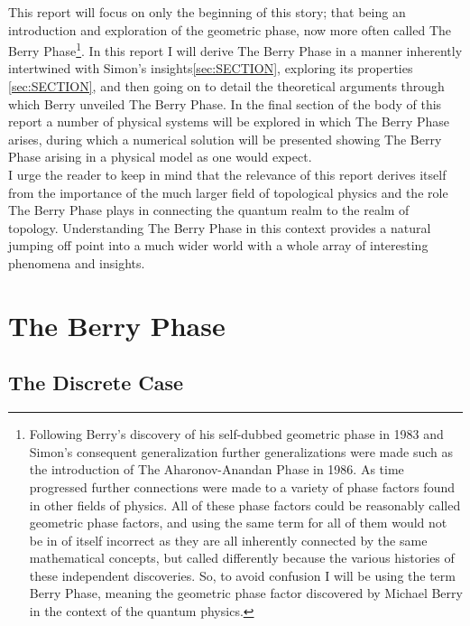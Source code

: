 \documentclass{article}
\begin{document}
This report will focus on only the beginning of this story; that being an introduction and exploration of the geometric phase, now more often called The Berry Phase\footnote{Following Berry's discovery of his self-dubbed geometric phase in 1983 and Simon's consequent generalization further generalizations were made such as the introduction of The Aharonov-Anandan Phase in 1986. As time progressed further connections were made to a variety of phase factors found in other fields of physics. All of these phase factors could be reasonably called geometric phase factors, and using the same term for all of them would not be in of itself incorrect as they are all inherently connected by the same mathematical concepts, but called differently because the various histories of these independent discoveries. So, to avoid confusion I will be using the term Berry Phase, meaning the geometric phase factor discovered by Michael Berry in the context of the quantum physics.}.  In this report I will derive The Berry Phase in a manner inherently intertwined with Simon's insights\ref{sec:SECTION}, exploring its properties \ref{sec:SECTION}, and then going on to detail the theoretical arguments through which Berry unveiled The Berry Phase. In the final section of the body of this report a number of physical systems will be explored in which The Berry Phase arises, during which a numerical solution will be presented showing The Berry Phase arising in a physical model as one would expect.\\

I urge the reader to keep in mind that the relevance of this report derives itself from the importance of the much larger field of topological physics and the role The Berry Phase plays in connecting the quantum realm to the realm of topology. Understanding The Berry Phase in this context provides a natural jumping off point into a much wider world with a whole array of interesting phenomena and insights.

\section{The Berry Phase}

\subsection{The Discrete Case}


\end{document}
